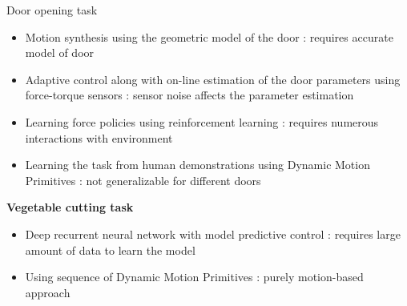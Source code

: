 \documentclass[aspectratio=169]{beamer}
\begin{document}
\begin{frame}
		\vspace{-0.5cm}
	Door opening task
	\begin{itemize}
		\item Motion synthesis using the geometric model of the door : requires accurate model of door
		\item Adaptive control along with on-line estimation of the door parameters using force-torque sensors : sensor noise affects the parameter estimation
		\item Learning force policies using reinforcement learning : requires numerous interactions with environment
		\item Learning the task from human demonstrations using Dynamic Motion Primitives : not generalizable for different doors
	\end{itemize}
	
	\textbf{Vegetable cutting task}
	\begin{itemize}
		\item Deep recurrent neural network with model predictive control : requires large amount of data to learn the model 
		\item Using sequence of Dynamic Motion Primitives : purely motion-based approach
	\end{itemize}
\end{frame}
\end{document}
